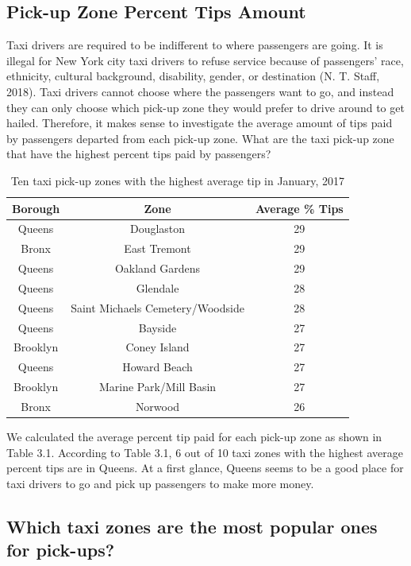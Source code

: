 \documentclass[12pt,twoside]{reedthesis}
\theoremstyle{definition}
\theoremstyle{definition}
\theoremstyle{definition}
\theoremstyle{remark}
\begin{document}
\subsection{Pick-up Zone Percent Tips
Amount}\label{pick-up-zone-percent-tips-amount}

Taxi drivers are required to be indifferent to where passengers are
going. It is illegal for New York city taxi drivers to refuse service
because of passengers' race, ethnicity, cultural background, disability,
gender, or destination (N. T. Staff, 2018). Taxi drivers cannot choose
where the passengers want to go, and instead they can only choose which
pick-up zone they would prefer to drive around to get hailed. Therefore,
it makes sense to investigate the average amount of tips paid by
passengers departed from each pick-up zone. What are the taxi pick-up
zone that have the highest percent tips paid by passengers?
\begin{table}

\caption{\label{tab:unnamed-chunk-39}Ten taxi pick-up zones with the highest average tip in January, 2017}
\centering
\begin{tabular}[t]{ccc}
\toprule
Borough & Zone & Average \% Tips\\
\midrule
Queens & Douglaston & 29\\
Bronx & East Tremont & 29\\
Queens & Oakland Gardens & 29\\
Queens & Glendale & 28\\
Queens & Saint Michaels Cemetery/Woodside & 28\\
\addlinespace
Queens & Bayside & 27\\
Brooklyn & Coney Island & 27\\
Queens & Howard Beach & 27\\
Brooklyn & Marine Park/Mill Basin & 27\\
Bronx & Norwood & 26\\
\bottomrule
\end{tabular}
\end{table}
We calculated the average percent tip paid for each pick-up zone as
shown in Table 3.1. According to Table 3.1, 6 out of 10 taxi zones with
the highest average percent tips are in Queens. At a first glance,
Queens seems to be a good place for taxi drivers to go and pick up
passengers to make more money.

\subsection{Which taxi zones are the most popular ones for
pick-ups?}\label{which-taxi-zones-are-the-most-popular-ones-for-pick-ups}
\end{document}
